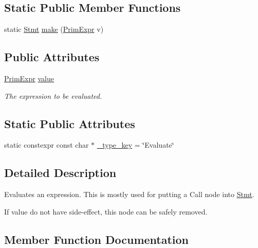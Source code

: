 \subsection*{Static Public Member Functions}
\begin{DoxyCompactItemize}
\item 
static \hyperlink{classtvm_1_1tir_1_1Stmt}{Stmt} \hyperlink{classtvm_1_1tir_1_1EvaluateNode_a5a3fc24b56f5b8eda0529a0c4ba11780}{make} (\hyperlink{classtvm_1_1PrimExpr}{Prim\+Expr} v)
\end{DoxyCompactItemize}
\subsection*{Public Attributes}
\begin{DoxyCompactItemize}
\item 
\hyperlink{classtvm_1_1PrimExpr}{Prim\+Expr} \hyperlink{classtvm_1_1tir_1_1EvaluateNode_acd67ddcaf6ec168e993710808ec94358}{value}
\begin{DoxyCompactList}\small\item\em The expression to be evaluated. \end{DoxyCompactList}\end{DoxyCompactItemize}
\subsection*{Static Public Attributes}
\begin{DoxyCompactItemize}
\item 
static constexpr const char $\ast$ \hyperlink{classtvm_1_1tir_1_1EvaluateNode_a9d2b4f296b1cfa85b64a03ca581cbea4}{\+\_\+type\+\_\+key} = \char`\"{}Evaluate\char`\"{}
\end{DoxyCompactItemize}


\subsection{Detailed Description}
Evaluates an expression. This is mostly used for putting a Call node into \hyperlink{classtvm_1_1tir_1_1Stmt}{Stmt}. 

If value do not have side-\/effect, this node can be safely removed. 

\subsection{Member Function Documentation}
